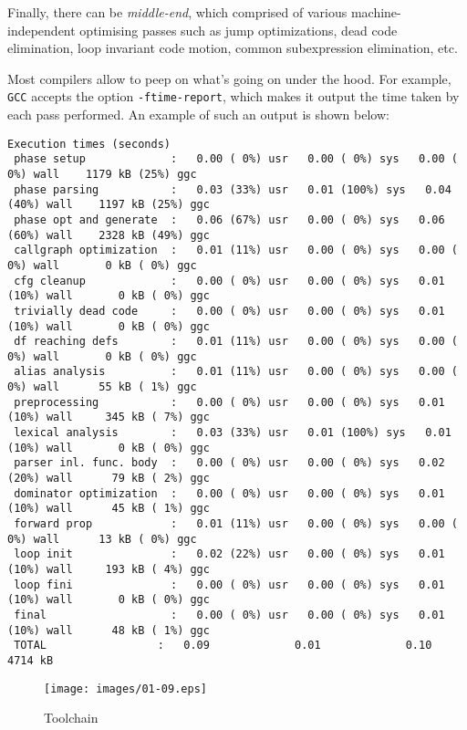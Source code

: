 Finally, there can be \emph{middle-end}, which comprised of various machine-independent optimising passes such as
jump optimizations, dead code elimination, loop invariant code motion, common subexpression elimination, etc.

Most compilers allow to peep on what's going on under the hood. For example, \texttt{GCC} accepts the
option \texttt{-ftime-report}, which makes it output the time taken by each pass performed. An example
of such an output is shown below:

\begin{scriptsize}
\begin{verbatim}
Execution times (seconds)
 phase setup             :   0.00 ( 0%) usr   0.00 ( 0%) sys   0.00 ( 0%) wall    1179 kB (25%) ggc
 phase parsing           :   0.03 (33%) usr   0.01 (100%) sys   0.04 (40%) wall    1197 kB (25%) ggc
 phase opt and generate  :   0.06 (67%) usr   0.00 ( 0%) sys   0.06 (60%) wall    2328 kB (49%) ggc
 callgraph optimization  :   0.01 (11%) usr   0.00 ( 0%) sys   0.00 ( 0%) wall       0 kB ( 0%) ggc
 cfg cleanup             :   0.00 ( 0%) usr   0.00 ( 0%) sys   0.01 (10%) wall       0 kB ( 0%) ggc
 trivially dead code     :   0.00 ( 0%) usr   0.00 ( 0%) sys   0.01 (10%) wall       0 kB ( 0%) ggc
 df reaching defs        :   0.01 (11%) usr   0.00 ( 0%) sys   0.00 ( 0%) wall       0 kB ( 0%) ggc
 alias analysis          :   0.01 (11%) usr   0.00 ( 0%) sys   0.00 ( 0%) wall      55 kB ( 1%) ggc
 preprocessing           :   0.00 ( 0%) usr   0.00 ( 0%) sys   0.01 (10%) wall     345 kB ( 7%) ggc
 lexical analysis        :   0.03 (33%) usr   0.01 (100%) sys   0.01 (10%) wall       0 kB ( 0%) ggc
 parser inl. func. body  :   0.00 ( 0%) usr   0.00 ( 0%) sys   0.02 (20%) wall      79 kB ( 2%) ggc
 dominator optimization  :   0.00 ( 0%) usr   0.00 ( 0%) sys   0.01 (10%) wall      45 kB ( 1%) ggc
 forward prop            :   0.01 (11%) usr   0.00 ( 0%) sys   0.00 ( 0%) wall      13 kB ( 0%) ggc
 loop init               :   0.02 (22%) usr   0.00 ( 0%) sys   0.01 (10%) wall     193 kB ( 4%) ggc
 loop fini               :   0.00 ( 0%) usr   0.00 ( 0%) sys   0.01 (10%) wall       0 kB ( 0%) ggc
 final                   :   0.00 ( 0%) usr   0.00 ( 0%) sys   0.01 (10%) wall      48 kB ( 1%) ggc
 TOTAL                 :   0.09             0.01             0.10               4714 kB
\end{verbatim}
\end{scriptsize}

\begin{figure}[t]
  \centering
  \texttt{[image: images/01-09.eps]}
  \caption{Toolchain}
  \label{toolchain}
\end{figure}

